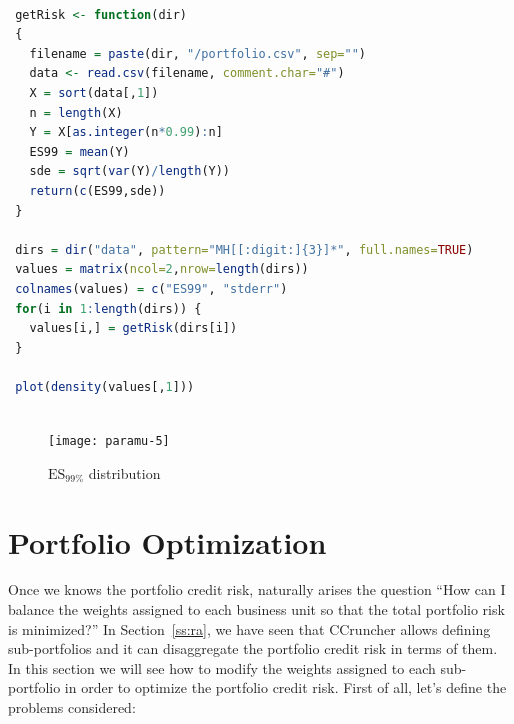 \documentclass[11pt,fleqn]{book} %
\begin{document}
\begin{lstlisting}[language=R, label={sc:paramu5}, caption={$ES_{99\%}$ distribution (R script)}]

 getRisk <- function(dir)
 {
   filename = paste(dir, "/portfolio.csv", sep="")
   data <- read.csv(filename, comment.char="#")
   X = sort(data[,1])
   n = length(X)
   Y = X[as.integer(n*0.99):n]
   ES99 = mean(Y)
   sde = sqrt(var(Y)/length(Y))
   return(c(ES99,sde))
 }

 dirs = dir("data", pattern="MH[[:digit:]{3}]*", full.names=TRUE)
 values = matrix(ncol=2,nrow=length(dirs))
 colnames(values) = c("ES99", "stderr")
 for(i in 1:length(dirs)) {
   values[i,] = getRisk(dirs[i])
 }
 
 plot(density(values[,1]))
 
\end{lstlisting}

\begin{figure}[!ht]
	\centering
	\texttt{[image: paramu-5]}
	\caption{$\text{ES}_{99\%}$ distribution}
	\label{fig:paramu5}
\end{figure}

\section{Portfolio Optimization}

Once we knows the portfolio credit risk, naturally arises the question ``How 
can I balance the weights assigned to each business unit so that the total 
portfolio risk is minimized?'' In Section~\ref{ss:ra}, we have seen that 
CCruncher allows defining sub-portfolios and it can disaggregate the portfolio 
credit risk in terms of them. In this section we will see how to modify the 
weights assigned to each sub-portfolio in order to optimize the portfolio
credit risk. First of all, let's define the problems considered:
\end{document}
